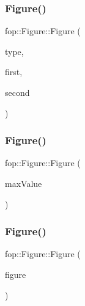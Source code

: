 \subsubsection{\texorpdfstring{Figure()}{Figure()}\hspace{0.1cm}{\footnotesize\ttfamily [2/4]}}
{\footnotesize\ttfamily fop\+::\+Figure\+::\+Figure (\begin{DoxyParamCaption}\item[{\mbox{\hyperlink{namespacefop_a60dafe2e1ac5bb402dad57ecacde23d5}{Figures\+Type}}}]{type,  }\item[{\mbox{\hyperlink{structtdp_1_1_point}{Point}}}]{first,  }\item[{\mbox{\hyperlink{structtdp_1_1_point}{Point}}}]{second }\end{DoxyParamCaption})}

\mbox{\label{classfop_1_1_figure_a2e24606aff7c6e923d3b1db4cb7f39df}} 
\subsubsection{\texorpdfstring{Figure()}{Figure()}\hspace{0.1cm}{\footnotesize\ttfamily [3/4]}}
{\footnotesize\ttfamily fop\+::\+Figure\+::\+Figure (\begin{DoxyParamCaption}\item[{\mbox{\hyperlink{structtdp_1_1_point}{Point}}}]{max\+Value }\end{DoxyParamCaption})}

\mbox{\label{classfop_1_1_figure_a2cc70342facf7064e5724651e351046b}} 
\subsubsection{\texorpdfstring{Figure()}{Figure()}\hspace{0.1cm}{\footnotesize\ttfamily [4/4]}}
{\footnotesize\ttfamily fop\+::\+Figure\+::\+Figure (\begin{DoxyParamCaption}\item[{const \mbox{\hyperlink{classfop_1_1_figure}{Figure}} \&}]{figure }\end{DoxyParamCaption})}

